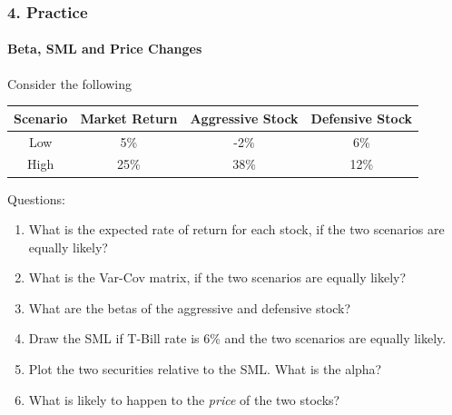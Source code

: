 \documentclass{beamer}
\begin{document}
\begin{practiceframe}[t]
    \frametitle{4. Practice}
    \framesubtitle{Beta, SML and Price Changes}

    Consider the following
    \footnotesize
    \begin{table}[h]
    \centering
    \begin{tabular}{cccc}
    \toprule
    \textbf{Scenario} & \textbf{Market Return} & \textbf{Aggressive Stock} & \textbf{Defensive Stock} \\
    \midrule
    Low & 5\% & -2\% & 6\% \\
    \hline
    High & 25\% & 38\% & 12\% \\
    \bottomrule
    \end{tabular}
    \end{table}

    Questions:
    \begin{enumerate}
        \item What is the expected rate of return for each stock, if the two scenarios are equally likely?
        \item What is the Var-Cov matrix, if the two scenarios are equally likely?
        \item What are the betas of the aggressive and defensive stock?
        \item Draw the SML if T-Bill rate is 6\% and the two scenarios are equally likely.
        \item Plot the two securities relative to the SML. What is the alpha?
        \item What is likely to happen to the \textit{price} of the two stocks?
    \end{enumerate}


\end{practiceframe}
\end{document}
